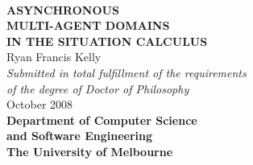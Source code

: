 %
%
%
%








\begin{titlepage}
\begin{center}
\ \\
\vspace{2cm}
{\bf\LARGE  ASYNCHRONOUS }\\ \vspace{0.5cm}
{\bf\LARGE  MULTI-AGENT DOMAINS }\\ \vspace{0.5cm}
{\bf\LARGE  IN THE SITUATION CALCULUS } \\
\vspace{3cm}
{\LARGE      Ryan Francis Kelly       }\\
\vspace{5cm}
{\em\large Submitted in total fulfillment of the requirements}\\ \vspace{0.1cm}
{\em\large        of the degree of Doctor of Philosophy     }\\
\vspace{0.5cm}
{\Large             October 2008        }\\
\vspace{2.5cm}
{\bf\large Department of Computer Science\\ and Software Engineering}\\ \vspace{0.5cm}
{\bf\Large        The University of Melbourne     }\\
\vspace{0.5cm}
\end{center}
\end{titlepage}

\cleardoublepage

